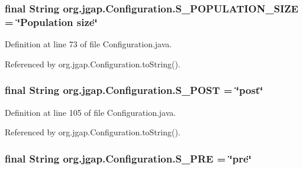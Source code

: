 \hypertarget{classorg_1_1jgap_1_1_configuration_a92ab2a0430f9e545f56f929998734431}{
\subsubsection[{S\-\_\-\-P\-O\-P\-U\-L\-A\-T\-I\-O\-N\-\_\-\-S\-I\-Z\-E}]{\setlength{\rightskip}{0pt plus 5cm}final String org.\-jgap.\-Configuration.\-S\-\_\-\-P\-O\-P\-U\-L\-A\-T\-I\-O\-N\-\_\-\-S\-I\-Z\-E = \char`\"{}Population size\char`\"{}\hspace{0.3cm}{\ttfamily [static]}}}\label{classorg_1_1jgap_1_1_configuration_a92ab2a0430f9e545f56f929998734431}


Definition at line 73 of file Configuration.\-java.



Referenced by org.\-jgap.\-Configuration.\-to\-String().

\hypertarget{classorg_1_1jgap_1_1_configuration_aff9c28a92d7b641a92ecaceb57cada54}{
\subsubsection[{S\-\_\-\-P\-O\-S\-T}]{\setlength{\rightskip}{0pt plus 5cm}final String org.\-jgap.\-Configuration.\-S\-\_\-\-P\-O\-S\-T = \char`\"{}post\char`\"{}\hspace{0.3cm}{\ttfamily [static]}}}\label{classorg_1_1jgap_1_1_configuration_aff9c28a92d7b641a92ecaceb57cada54}


Definition at line 105 of file Configuration.\-java.



Referenced by org.\-jgap.\-Configuration.\-to\-String().

\hypertarget{classorg_1_1jgap_1_1_configuration_a951ebe1745dbdac77825e060fd6df54d}{
\subsubsection[{S\-\_\-\-P\-R\-E}]{\setlength{\rightskip}{0pt plus 5cm}final String org.\-jgap.\-Configuration.\-S\-\_\-\-P\-R\-E = \char`\"{}pre\char`\"{}\hspace{0.3cm}{\ttfamily [static]}}}\label{classorg_1_1jgap_1_1_configuration_a951ebe1745dbdac77825e060fd6df54d}


